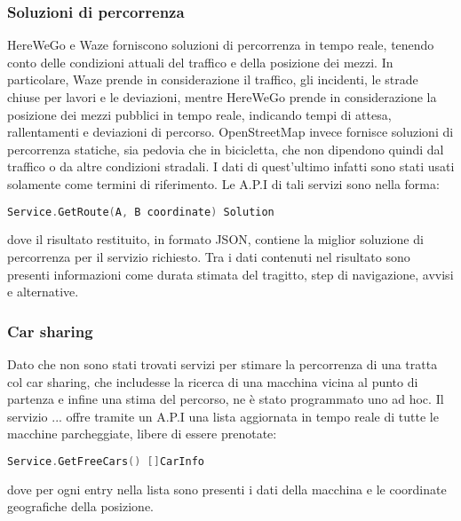 \subsubsection{Soluzioni di percorrenza}

HereWeGo e Waze forniscono soluzioni di percorrenza in tempo reale, tenendo conto delle condizioni attuali del traffico e della posizione dei mezzi. In particolare, Waze prende in considerazione il traffico, gli incidenti, le strade chiuse per lavori e le deviazioni, mentre HereWeGo prende in considerazione la posizione dei mezzi pubblici in tempo reale, indicando tempi di attesa, rallentamenti e deviazioni di percorso. OpenStreetMap invece fornisce soluzioni di percorrenza statiche, sia pedovia che in bicicletta, che non dipendono quindi dal traffico o da altre condizioni stradali. I dati di quest'ultimo infatti sono stati usati solamente come termini di riferimento. Le A.P.I di tali servizi sono nella forma:
\begin{lstlisting}[language=Go]
Service.GetRoute(A, B coordinate) Solution
\end{lstlisting}
dove il risultato restituito, in formato JSON, contiene la miglior soluzione di percorrenza per il servizio richiesto. Tra i dati contenuti nel risultato sono presenti informazioni come durata stimata del tragitto, step di navigazione, avvisi e alternative.

\subsubsection{Car sharing}

Dato che non sono stati trovati servizi per stimare la percorrenza di una tratta col car sharing, che includesse la ricerca di una macchina vicina al punto di partenza e infine una stima del percorso, ne è stato programmato uno ad hoc. Il servizio ... offre tramite un A.P.I una lista aggiornata in tempo reale di tutte le macchine parcheggiate, libere di essere prenotate:
\begin{lstlisting}[language=Go]
Service.GetFreeCars() []CarInfo
\end{lstlisting}
dove per ogni entry nella lista sono presenti i dati della macchina e le coordinate geografiche della posizione.

